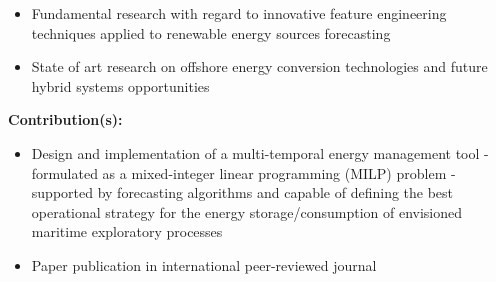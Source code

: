 \documentclass{mycv}
\begin{document}
\begin{myitemize}
		\begin{itemize}[itemsep=1px]
			\item Fundamental research with regard to innovative feature engineering techniques applied to renewable energy sources forecasting
			\item State of art research on offshore energy conversion technologies and future hybrid systems opportunities
		\end{itemize}
		
		\vspace{0.2cm}
		\textbf{Contribution(s):}
		
		\begin{itemize}[itemsep=1px]
			\item Design and implementation of a multi-temporal energy management tool - formulated as a mixed-integer linear programming (MILP) problem - supported by forecasting algorithms and capable of defining the best operational strategy for the energy storage/consumption of envisioned maritime exploratory processes
			\item Paper publication in international peer-reviewed journal
		\end{itemize}
		


		
\end{myitemize}


\end{document}

